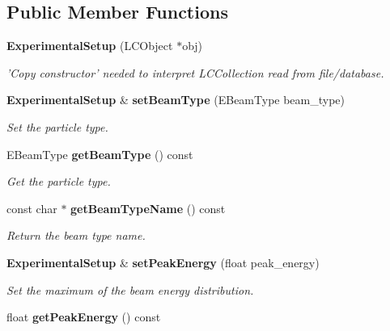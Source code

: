 \subsection*{Public Member Functions}
\begin{DoxyCompactItemize}
\item 
{\bf ExperimentalSetup} (LCObject $\ast$obj)\label{classCALICE_1_1ExperimentalSetup_a88f1b7e3e0bcfa5ef4a7941aa73e9695}

\begin{DoxyCompactList}\small\item\em 'Copy constructor' needed to interpret LCCollection read from file/database. \item\end{DoxyCompactList}\item 
{\bf ExperimentalSetup} \& {\bf setBeamType} (EBeamType beam\_\-type)\label{classCALICE_1_1ExperimentalSetup_a20e8811ecac60c745309792aeaf309c3}

\begin{DoxyCompactList}\small\item\em Set the particle type. \item\end{DoxyCompactList}\item 
EBeamType {\bf getBeamType} () const \label{classCALICE_1_1ExperimentalSetup_aed66233c7e7f7aaab32bf2fc52be38a6}

\begin{DoxyCompactList}\small\item\em Get the particle type. \item\end{DoxyCompactList}\item 
const char $\ast$ {\bf getBeamTypeName} () const \label{classCALICE_1_1ExperimentalSetup_ac337adc9b904f67631ca5686fe348c77}

\begin{DoxyCompactList}\small\item\em Return the beam type name. \item\end{DoxyCompactList}\item 
{\bf ExperimentalSetup} \& {\bf setPeakEnergy} (float peak\_\-energy)\label{classCALICE_1_1ExperimentalSetup_a6bdbbf294d4f9a219c11000887845a42}

\begin{DoxyCompactList}\small\item\em Set the maximum of the beam energy distribution. \item\end{DoxyCompactList}\item 
float {\bf getPeakEnergy} () const \label{classCALICE_1_1ExperimentalSetup_adc0d1f521ba8c3cca79caa412f05f807}


\end{DoxyCompactItemize}
